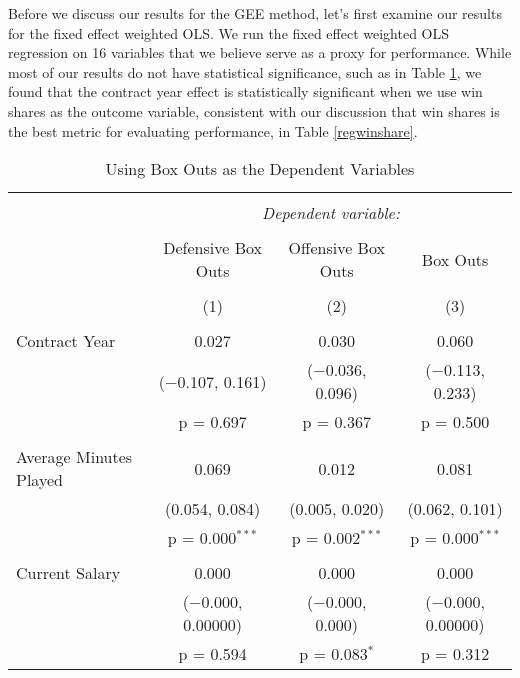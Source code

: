 \documentclass[12pt]{article}
\begin{document}
	Before we discuss our results for the GEE method, let's first examine our results for the fixed effect weighted OLS. We run the fixed effect weighted OLS regression on 16 variables that we believe serve as a proxy for performance. While most of our results do not have statistical significance, such as in Table \ref{regboxout}, we found that the contract year effect is statistically significant when we use win shares as the outcome variable, consistent with our discussion that win shares is the best metric for evaluating performance, in Table \ref{regwinshare}.
	
	\begin{landscape}
		\begin{table}[!htbp] \centering 
			\caption{Using Box Outs as the Dependent Variables} 
			\label{regboxout} 
			\begin{tabular}{@{\extracolsep{5pt}}lccc} 
				\\[-1.8ex]\hline 
				\hline \\[-1.8ex] 
				& \multicolumn{3}{c}{\textit{Dependent variable:}} \\ 
				\cline{2-4} 
				\\[-1.8ex] & Defensive Box Outs & Offensive Box Outs & Box Outs \\ 
				\\[-1.8ex] & (1) & (2) & (3)\\ 
				\hline \\[-1.8ex] 
				Contract Year & 0.027 & 0.030 & 0.060 \\ 
				& ($-$0.107, 0.161) & ($-$0.036, 0.096) & ($-$0.113, 0.233) \\ 
				& p = 0.697 & p = 0.367 & p = 0.500 \\ 
				& & & \\ 
				Average Minutes Played & 0.069 & 0.012 & 0.081 \\ 
				& (0.054, 0.084) & (0.005, 0.020) & (0.062, 0.101) \\ 
				& p = 0.000$^{***}$ & p = 0.002$^{***}$ & p = 0.000$^{***}$ \\ 
				& & & \\ 
				Current Salary & 0.000 & 0.000 & 0.000 \\ 
				& ($-$0.000, 0.00000) & ($-$0.000, 0.000) & ($-$0.000, 0.00000) \\ 
				& p = 0.594 & p = 0.083$^{*}$ & p = 0.312 \\ 

\end{tabular}
\end{table}
\end{landscape}
\end{document}
